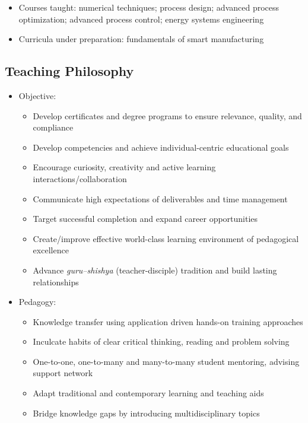 \documentclass[10pt]{article}
\begin{document}
\begin{itemize}[nosep]
\item Courses taught: numerical techniques; process design; advanced process optimization; advanced process control; energy systems engineering
\item Curricula under preparation: fundamentals of smart manufacturing
\end{itemize}


\subsection{Teaching Philosophy}
\begin{itemize}
\item Objective:
\begin{itemize}[nosep]
\item Develop certificates and degree programs to ensure relevance, quality, and compliance
\item Develop competencies and achieve individual-centric educational goals
\item Encourage curiosity, creativity and active learning interactions/collaboration
\item Communicate high expectations of deliverables and time management
\item Target successful completion and expand career opportunities
\item Create/improve effective world-class learning environment of pedagogical excellence
\item Advance \emph{guru–shishya} (teacher-disciple) tradition and build lasting relationships %
\end{itemize}

\item Pedagogy:
\begin{itemize}[nosep]
\item Knowledge transfer using application driven hands-on training approaches
\item Inculcate habits of clear critical thinking, reading and problem solving
\item One-to-one, one-to-many and many-to-many student mentoring, advising support network
\item Adapt traditional and contemporary learning and teaching aids
\item Bridge knowledge gaps by introducing multidisciplinary topics
\end{itemize}


\end{itemize}
\end{document}
